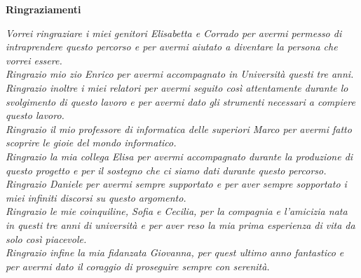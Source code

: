 \thispagestyle{empty}

\begin{center}
  {\bf \Huge Ringraziamenti}
\end{center}

\vspace{4cm}
\emph{Vorrei ringraziare i miei genitori Elisabetta e Corrado per avermi permesso di intraprendere questo percorso e per avermi aiutato a diventare la persona che vorrei essere.\\[12pt]
	Ringrazio mio zio Enrico per avermi accompagnato in Universit\`a questi tre anni.\\[12pt]
	Ringrazio inoltre i miei relatori per avermi seguito cos\`i attentamente durante lo svolgimento di questo lavoro e per avermi dato gli strumenti necessari a compiere questo lavoro.\\[12pt]
	Ringrazio il mio professore di informatica delle superiori Marco per avermi fatto scoprire le gioie del mondo informatico.\\[12pt]
	Ringrazio la mia collega Elisa per avermi accompagnato durante la produzione di questo progetto e per il sostegno che ci siamo dati durante questo percorso.\\[12pt]
	Ringrazio Daniele per avermi sempre supportato e per aver sempre sopportato i miei infiniti discorsi su questo argomento.\\[12pt]
	Ringrazio le mie coinquiline, Sofia e Cecilia, per la compagnia e l'amicizia nata in questi tre anni di universit\`a e per aver reso la mia prima esperienza di vita da solo cos\`i piacevole.\\[12pt]
	Ringrazio infine la mia fidanzata Giovanna, per quest ultimo anno fantastico e per avermi dato il coraggio di proseguire sempre con serenit\`a.
}
